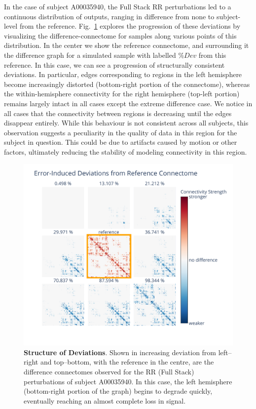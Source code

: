 \documentclass[fleqn,12pt]{SelfArx_ch} %
\begin{document}
In the case of subject A00035940, the Full Stack RR perturbations led to a continuous distribution of outputs, ranging
in difference from none to subject-level from the reference. Fig.~\ref{fig3:exploration} explores the progression of
these deviations by visualizing the difference-connectome for samples along various points of this distribution. In the
center we show the reference connectome, and surrounding it the difference graph for a simulated sample with labelled
$\% Dev$ from this reference. In this case, we can see a progression of structurally consistent deviations. In
particular, edges corresponding to regions in the left hemisphere become increasingly distorted (bottom-right portion
of the connectome), whereas the within-hemisphere connectivity for the right hemisphere (top-left portion) remains
largely intact in all cases except the extreme difference case. We notice in all cases that the connectivity between
regions is decreasing until the edges disappear entirely. While this behaviour is not consistent across all subjects,
this observation suggests a peculiarity in the quality of data in this region for the subject in question. This could
be due to artifacts caused by motion or other factors, ultimately reducing the stability of modeling connectivity in
this region.

\begin{figure}[t!]
    \centerline{\includegraphics[width=\linewidth]{figures/fig3_fro_A00035940_panel.pdf}}
\caption{\textbf{Structure of Deviations}. Shown in increasing deviation from
left--right and top--bottom, with the reference in the centre, are the difference
connectomes observed for the RR (Full Stack) perturbations of subject A00035940.
In this case, the left hemisphere (bottom-right portion of the graph) begins to
degrade quickly, eventually reaching an almost complete loss in signal.}
\label{fig3:exploration}
\end{figure}
\end{document}
